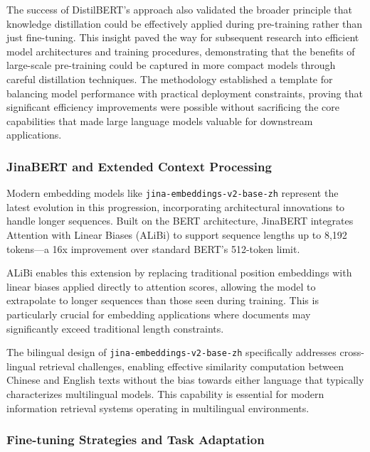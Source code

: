 \documentclass[
  titlepage]{article}
\begin{document}
The success of DistilBERT's approach also validated the broader
principle that knowledge distillation could be effectively applied
during pre-training rather than just fine-tuning. This insight paved the
way for subsequent research into efficient model architectures and
training procedures, demonstrating that the benefits of large-scale
pre-training could be captured in more compact models through careful
distillation techniques. The methodology established a template for
balancing model performance with practical deployment constraints,
proving that significant efficiency improvements were possible without
sacrificing the core capabilities that made large language models
valuable for downstream applications.

\subsubsection{JinaBERT and Extended Context
Processing}\label{jinabert-and-extended-context-processing}

Modern embedding models like \texttt{jina-embeddings-v2-base-zh}
represent the latest evolution in this progression, incorporating
architectural innovations to handle longer sequences. Built on the BERT
architecture, JinaBERT integrates Attention with Linear Biases (ALiBi)
to support sequence lengths up to 8,192 tokens---a 16x improvement over
standard BERT's 512-token limit.

ALiBi enables this extension by replacing traditional position
embeddings with linear biases applied directly to attention scores,
allowing the model to extrapolate to longer sequences than those seen
during training. This is particularly crucial for embedding applications
where documents may significantly exceed traditional length constraints.

The bilingual design of \texttt{jina-embeddings-v2-base-zh} specifically
addresses cross-lingual retrieval challenges, enabling effective
similarity computation between Chinese and English texts without the
bias towards either language that typically characterizes multilingual
models. This capability is essential for modern information retrieval
systems operating in multilingual environments.

\subsubsection{Fine-tuning Strategies and Task
Adaptation}\label{fine-tuning-strategies-and-task-adaptation}
\end{document}
